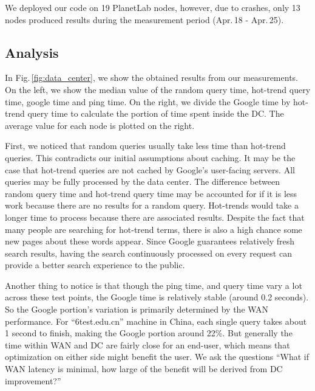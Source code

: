 We deployed our code on 19 PlanetLab nodes, however, due to crashes, only 13 nodes produced results during the measurement period (Apr.\,18 - Apr.\,25).

\subsection{Analysis}
\label{sec:dc-analysis}

In Fig.\,\ref{fig:data_center}, we show the obtained results from our measurements. On the left, we show the median value of the random query time, hot-trend query time, google time and ping time. On the right, we divide the Google time by hot-trend query time to calculate the portion of time spent inside the DC. The average value for each node is plotted on the right.

First, we noticed that random queries usually take less time than hot-trend queries. This contradicts our initial assumptions about caching. It may be the case that hot-trend queries are not cached by Google's user-facing servers. All queries may be fully processed by the data center. The difference between random query time and hot-trend query time may be accounted for if it is less work because there are no results for a random query. Hot-trends would take a longer time to process because there are associated results.  Despite the fact that many people are searching for hot-trend terms, there is also a high chance some new pages about these words appear. Since Google guarantees relatively fresh search results, having the search continuously processed on every request can provide a better search experience to the public.

Another thing to notice is that though the ping time, and query time vary a lot across these test points, the Google time is relatively stable (around 0.2 seconds). So the Google portion's variation is primarily determined by the WAN performance. For ``6test.edu.cn'' machine in China, each single query takes about 1 second to finish, making the Google portion around 22\%. But generally the time within WAN and DC are fairly close for an end-user, which means that optimization on either side might benefit the user. We ask the questions ``What if WAN latency is minimal, how large of the benefit will be derived from DC improvement?''

